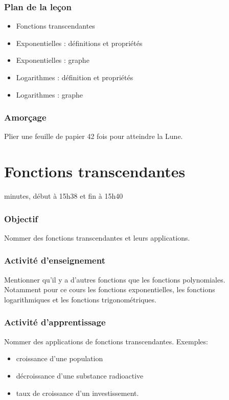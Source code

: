 \documentclass[12pt]{article}
\begin{document}
\subsubsection*{\faList{} Plan de la leçon}
\begin{itemize}
    \item Fonctions transcendantes
    \item Exponentielles : définitions et propriétés
    \item Exponentielles : graphe
    \item Logarithmes : définition et propriétés
    \item Logarithmes : graphe
\end{itemize}
\subsubsection*{\faSurprise[regular]{} Amorçage}
Plier une feuille de papier 42 fois pour atteindre la Lune.

\clearpage
\section{Fonctions transcendantes}
 minutes, début à 15h38 et fin à 15h40
\subsubsection*{\faBullseye{} Objectif}
Nommer des fonctions transcendantes et leurs applications.
\subsubsection*{\faChalkboardTeacher{} Activité d'enseignement}
Mentionner qu'il y a d'autres fonctions que les fonctions polynomiales. Notamment pour ce cours les fonctions exponentielles, les fonctions logarithmiques et les fonctions trigonométriques.
\subsubsection*{\faCalculator{} Activité d'apprentissage}
Nommer des applications de fonctions transcendantes. Exemples: 
\begin{itemize}
\item croissance d'une population
\item décroissance d'une substance radioactive
\item taux de croissance d'un investissement.
\end{itemize}
\end{document}
